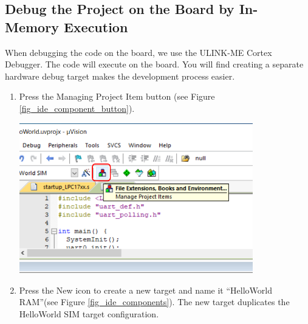   \subsection{Debug the Project on the Board by In-Memory Execution}
  \label{sec_debug_target_ram}
When debugging the code on the board, we use the ULINK-ME Cortex Debugger. The code will execute on the board. You will find creating a separate hardware debug target makes the development process easier. 

    \begin{enumerate}
      \item Press the Managing Project Item button (see Figure \ref{fig_ide_component_button}). \par
        \begin{minipage}{\linewidth}
            \centering
            \includegraphics[width=4in]{figure/uv5/IDE_component_button}
            \label{fig_ide_component_button}
        \end{minipage}
  
      \item Press the New icon to create a new target and name it ``HelloWorld RAM''(see Figure \ref{fig_ide_components}). The new target duplicates the HelloWorld SIM target configuration. \par 


\end{enumerate}
